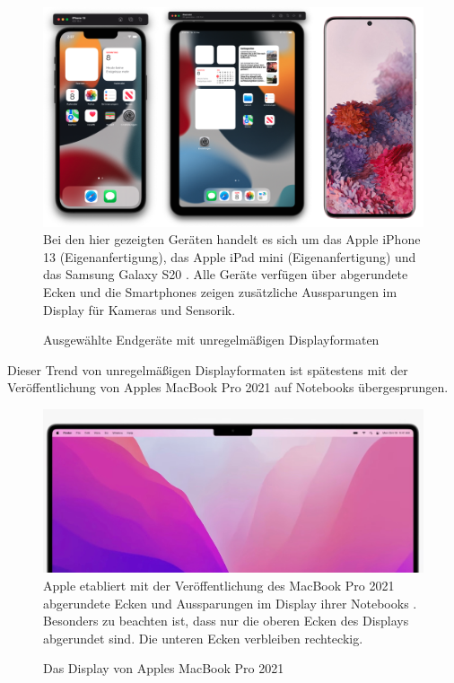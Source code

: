 \documentclass[a4paper]{scrartcl}
\begin{document}
\begin{figure}[H]
	\centering
	\caption{Ausgewählte Endgeräte mit unregelmäßigen Displayformaten}
	\includegraphics[scale=0.25]{_assets/phones_displays.png} \\
	\justifying
	\small	
	Bei den hier gezeigten Geräten handelt es sich um das Apple iPhone 13 (Eigenanfertigung), das Apple iPad mini (Eigenanfertigung) und das Samsung Galaxy S20 \autocite{Galaxy_Picture}. Alle Geräte verfügen über abgerundete Ecken und die Smartphones zeigen zusätzliche Aussparungen im Display für Kameras und Sensorik.
\end{figure}

Dieser Trend von unregelmäßigen Displayformaten ist spätestens mit der Veröffentlichung von Apples MacBook Pro 2021 auf Notebooks übergesprungen.

\begin{figure}[H]
	\centering
	\caption{Das Display von Apples MacBook Pro 2021}
	\includegraphics[scale=0.2]{_assets/MacBook_betterDisplay.jpeg} \\
	\justifying
	\small	
	Apple etabliert mit der Veröffentlichung des MacBook Pro 2021 abgerundete Ecken und Aussparungen im Display ihrer Notebooks \autocite{MacBook}. Besonders zu beachten ist, dass nur die oberen Ecken des Displays abgerundet sind. Die unteren Ecken verbleiben rechteckig.
\end{figure}
\end{document}
